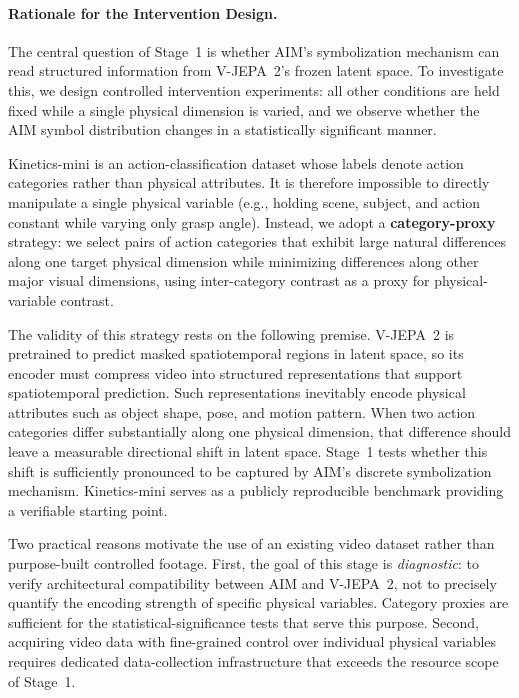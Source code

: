 \documentclass{article}
\begin{document}
\paragraph{Rationale for the Intervention Design.}
The central question of Stage~1 is whether AIM's symbolization mechanism can
read structured information from V-JEPA~2's frozen latent space.  To investigate
this, we design controlled intervention experiments: all other conditions are
held fixed while a single physical dimension is varied, and we observe whether
the AIM symbol distribution changes in a statistically significant manner.

Kinetics-mini is an action-classification dataset whose labels denote action
categories rather than physical attributes.  It is therefore impossible to
directly manipulate a single physical variable (e.g., holding scene, subject,
and action constant while varying only grasp angle).  Instead, we adopt a
\textbf{category-proxy} strategy: we select pairs of action categories that
exhibit large natural differences along one target physical dimension while
minimizing differences along other major visual dimensions, using inter-category
contrast as a proxy for physical-variable contrast.

The validity of this strategy rests on the following premise.  V-JEPA~2 is
pretrained to predict masked spatiotemporal regions in latent space, so its
encoder must compress video into structured representations that support
spatiotemporal prediction.  Such representations inevitably encode physical
attributes such as object shape, pose, and motion pattern.  When two action
categories differ substantially along one physical dimension, that difference
should leave a measurable directional shift in latent space.  Stage~1 tests
whether this shift is sufficiently pronounced to be captured by AIM's discrete
symbolization mechanism.  Kinetics-mini serves as a publicly reproducible
benchmark providing a verifiable starting point.

Two practical reasons motivate the use of an existing video dataset rather than
purpose-built controlled footage.  First, the goal of this stage is
\emph{diagnostic}: to verify architectural compatibility between AIM and
V-JEPA~2, not to precisely quantify the encoding strength of specific physical
variables.  Category proxies are sufficient for the statistical-significance
tests that serve this purpose.  Second, acquiring video data with fine-grained
control over individual physical variables requires dedicated data-collection
infrastructure that exceeds the resource scope of Stage~1.
\end{document}
